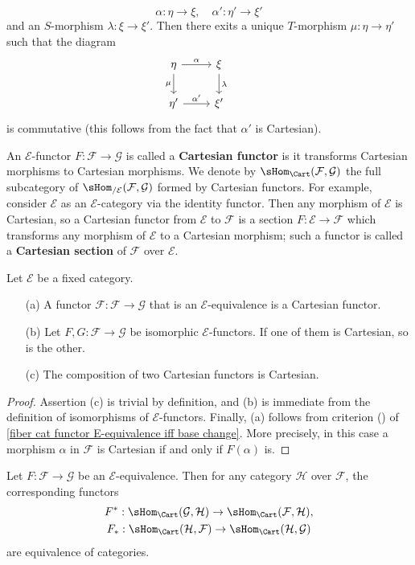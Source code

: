 \[\alpha:\eta\to \xi,\quad \alpha':\eta'\to \xi'\]
and an $S$-morphism $\lambda:\xi\to \xi'$. Then there exits a unique  $T$-morphism $\mu:\eta\to \eta'$ such that the diagram
\[\begin{tikzcd}
\eta\ar[d,swap,"\mu"]\ar[r,"\alpha"]&\xi\ar[d,"\lambda"]&\\
\eta'\ar[r,"\alpha'"]&\xi'
\end{tikzcd}\]
is commutative (this follows from the fact that $\alpha'$ is Cartesian).\par
An $\mathcal{E}$-functor $F:\mathcal{F}\to \mathcal{G}$ is called a \textbf{Cartesian functor} is it transforms Cartesian morphisms to Cartesian morphisms. We denote by $\sHom_{\Cart}(\mathcal{F},\mathcal{G})$ the full subcategory of $\sHom_{/\mathcal{E}}(\mathcal{F},\mathcal{G})$ formed by Cartesian functors. For example, consider $\mathcal{E}$ as an $\mathcal{E}$-category via the identity functor. Then any morphism of $\mathcal{E}$ is Cartesian, so a Cartesian functor from $\mathcal{E}$ to $\mathcal{F}$ is a section $F:\mathcal{E}\to \mathcal{F}$ which transforms any morphism of $\mathcal{E}$ to a Cartesian morphism; such a functor is called a \textbf{Cartesian section} of $\mathcal{F}$ over $\mathcal{E}$.
\begin{proposition}\label{fiber cat Cartesian functor prop}
Let $\mathcal{E}$ be a fixed category.
\begin{enumerate}
\item[(a)] A functor $\mathcal{F}:\mathcal{F}\to \mathcal{G}$ that is an $\mathcal{E}$-equivalence is a Cartesian functor.
\item[(b)] Let $F,G:\mathcal{F}\to \mathcal{G}$ be isomorphic $\mathcal{E}$-functors. If one of them is Cartesian, so is the other.
\item[(c)] The composition of two Cartesian functors is Cartesian.
\end{enumerate}
\end{proposition}
\begin{proof}
Assertion (c) is trivial by definition, and (b) is immediate from the definition of isomorphisms of $\mathcal{E}$-functors. Finally, (a) follows from criterion () of \cref{fiber cat functor E-equivalence iff base change}. More precisely, in this case a morphism $\alpha$ in $\mathcal{F}$ is Cartesian if and only if $F(\alpha)$ is.
\end{proof}
\begin{corollary}\label{fiber cat E-equivalence induced Cartesian Hom equivalence}
Let $F:\mathcal{F}\to \mathcal{G}$ be an $\mathcal{E}$-equivalence. Then for any category $\mathcal{H}$ over $\mathcal{F}$, the corresponding functors
\begin{gather*}
F^*:\sHom_{\Cart}(\mathcal{G},\mathcal{H})\to \sHom_{\Cart}(\mathcal{F},\mathcal{H}),\\
F_*:\sHom_{\Cart}(\mathcal{H},\mathcal{F})\to \sHom_{\Cart}(\mathcal{H},\mathcal{G})
\end{gather*}
are equivalence of categories.
\end{corollary}
